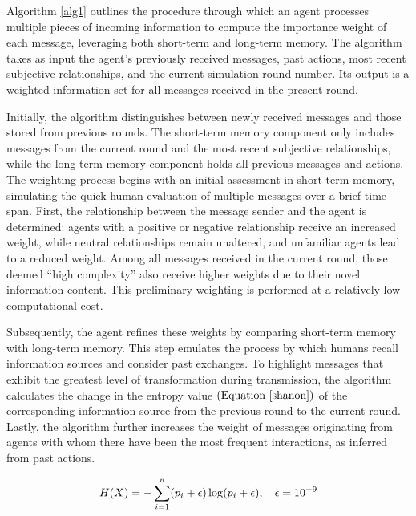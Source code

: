 Algorithm \ref{alg1} outlines the procedure through which an agent processes multiple pieces of incoming information to compute the importance weight of each message, leveraging both short-term and long-term memory. The algorithm takes as input the agent’s previously received messages, past actions, most recent subjective relationships, and the current simulation round number. Its output is a weighted information set for all messages received in the present round.

Initially, the algorithm distinguishes between newly received messages and those stored from previous rounds. The short-term memory component only includes messages from the current round and the most recent subjective relationships, while the long-term memory component holds all previous messages and actions. The weighting process begins with an initial assessment in short-term memory, simulating the quick human evaluation of multiple messages over a brief time span. First, the relationship between the message sender and the agent is determined: agents with a positive or negative relationship receive an increased weight, while neutral relationships remain unaltered, and unfamiliar agents lead to a reduced weight. Among all messages received in the current round, those deemed “high complexity” also receive higher weights due to their novel information content. This preliminary weighting is performed at a relatively low computational cost.

Subsequently, the agent refines these weights by comparing short-term memory with long-term memory. This step emulates the process by which humans recall information sources and consider past exchanges. To highlight messages that exhibit the greatest level of transformation during transmission, the algorithm calculates the change in the entropy value \(\left(\text{Equation}~\ref{shanon}\right)\) of the corresponding information source from the previous round to the current round. Lastly, the algorithm further increases the weight of messages originating from agents with whom there have been the most frequent interactions, as inferred from past actions.

\vspace{-15pt}
\begin{equation}
\small
    H(X) = -\sum_{i=1}^{n} (p_i + \epsilon) \log (p_i + \epsilon), \quad \epsilon = 10^{-9}
\label{shanon}
\end{equation}
\vspace{-15pt}



